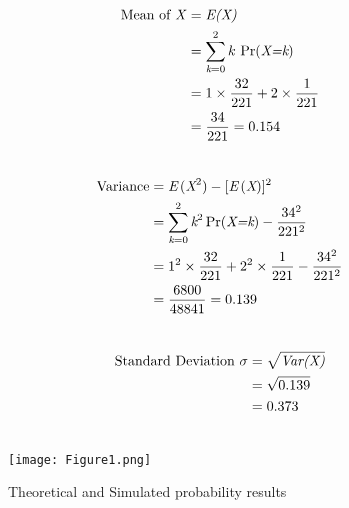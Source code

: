 \documentclass[journal,12pt,twocolumn]{IEEEtran}
\begin{document}
\begin{align}
\nonumber\text{Mean of \emph{X}}&= \emph{E(X)} \\ \nonumber
               &=\sum_{\emph{k}=0}^{2} \nonumber k\,\Pr(\emph{X=k})\\\nonumber
               &=1 \times\frac{32}{221}+2 \times\frac{1}{221}\\
               &= \frac{34}{221} = 0.154\\\nonumber
\end{align}

\begin{align}
\nonumber\text{Variance} &=\emph{E}\,(\emph{X}^2) - [\emph{E}\,(\emph{X})]^2\\\nonumber
                  &= \sum_{\emph{k}=0}^{2} \emph{k}^2 \Pr(\emph{X=k}) - \frac{34^2}{221^2}\\\nonumber
                  &= 1^2\times\frac{32}{221} + 2^2\times\frac{1}{221} - \frac{34^2}{221^2}\\\vspace{0.1cm}
                  &= \frac{6800}{48841} = 0.139\\\nonumber
\end{align}

\begin{align}
\nonumber\text{Standard Deviation }\sigma &= \sqrt{\emph{Var(X)}}\\ \nonumber
&= \sqrt{0.139}\\ &= 0.373\\\nonumber
\end{align}

\newpage
\begin{figure}[h!]
    \texttt{[image: Figure1.png]}
    \caption{\large Theoretical and Simulated probability results}
\end{figure}
\end{document}
